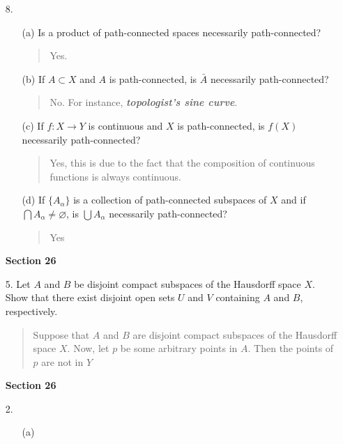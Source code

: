 \documentclass[12pt, a4paper]{article}
\renewcommand{\emptyset}{\varnothing}  %
\begin{document}
\begin{itemize}
\item[]
\item[]

\item[8.]
\begin{itemize}
\item[(a)]
Is a product of path-connected spaces necessarily path-connected?
\begin{quote}
Yes.
\end{quote}

\item[]

\item[(b)]
If $A \subset X$ and $A$ is path-connected, is $\bar{A}$
necessarily path-connected?
\begin{quote}
No. For instance, \textbf{\textit{topologist's sine curve}}.
\end{quote}

\item[]

\item[(c)]
If $f: X \to Y$ is continuous and $X$ is path-connected, is $f(X)$ necessarily path-connected?
\begin{quote}
Yes, this is due to the fact that the composition of continuous functions is always continuous.
\end{quote}

\item[]

\item[(d)]
If $\{A_\alpha\}$ is a collection of path-connected subspaces of $X$ and if $\bigcap A_\alpha \neq \emptyset$, is $\bigcup A_\alpha$ necessarily path-connected?
\begin{quote}
Yes
\end{quote}
\end{itemize}

\item[]
\item[]
{\large \textbf{Section 26}}
\vspace{0.3cm}

\item[5.]
Let $A$ and $B$ be disjoint compact subspaces of the Hausdorff space $X$. Show that there exist disjoint open sets $U$ and $V$ containing $A$ and $B$, respectively.
\begin{quote}
Suppose that $A$ and $B$ are disjoint compact subspaces
of the Hausdorff space $X$. Now, let $p$ be some arbitrary
points in $A$. Then the points of $p$ are not in $Y$
\end{quote}

\item[]
\item[]
\item[]
{\large \textbf{Section 26}}
\vspace{0.3cm}

\item[2.]
\begin{itemize}
\item[(a)]
\end{itemize}

\end{itemize}
\end{document}

